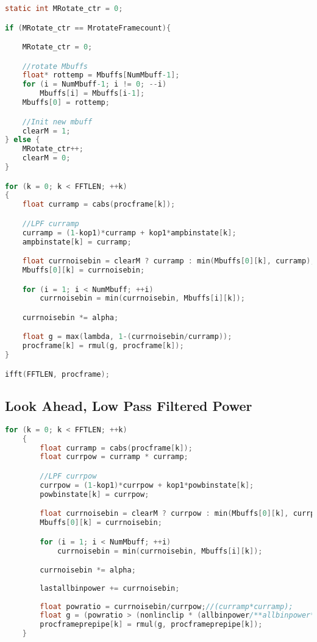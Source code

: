 \documentclass[11pt]{article} %
\begin{document}
{\begin{center}
\begin{lstlisting}[language = C]
static int MRotate_ctr = 0;

if (MRotate_ctr == MrotateFramecount){

	MRotate_ctr = 0;

	//rotate Mbuffs
	float* rottemp = Mbuffs[NumMbuff-1];
	for (i = NumMbuff-1; i != 0; --i)
		Mbuffs[i] = Mbuffs[i-1];
	Mbuffs[0] = rottemp;

	//Init new mbuff
	clearM = 1;
} else {
	MRotate_ctr++;
	clearM = 0;
}

for (k = 0; k < FFTLEN; ++k)
{
	float curramp = cabs(procframe[k]); 

	//LPF curramp
	curramp = (1-kop1)*curramp + kop1*ampbinstate[k];
	ampbinstate[k] = curramp;

	float currnoisebin = clearM ? curramp : min(Mbuffs[0][k], curramp);
	Mbuffs[0][k] = currnoisebin;

	for (i = 1; i < NumMbuff; ++i)
		currnoisebin = min(currnoisebin, Mbuffs[i][k]);

	currnoisebin *= alpha;

	float g = max(lambda, 1-(currnoisebin/curramp));
	procframe[k] = rmul(g, procframe[k]);
}

ifft(FFTLEN, procframe);
 	\end{lstlisting}
 \end{center}

\clearpage

  \subsection{Look Ahead, Low Pass Filtered Power} %
 \label{app:delayprepipe}
 \begin{center}
 	\begin{lstlisting}[language = C]
	for (k = 0; k < FFTLEN; ++k)
	{
		float curramp = cabs(procframe[k]);
		float currpow = curramp * curramp;

		//LPF currpow
		currpow = (1-kop1)*currpow + kop1*powbinstate[k];
		powbinstate[k] = currpow;

		float currnoisebin = clearM ? currpow : min(Mbuffs[0][k], currpow);
		Mbuffs[0][k] = currnoisebin;

		for (i = 1; i < NumMbuff; ++i)
			currnoisebin = min(currnoisebin, Mbuffs[i][k]);

		currnoisebin *= alpha;
		
		lastallbinpower += currnoisebin;
		
		float powratio = currnoisebin/currpow;//(curramp*curramp);
		float g = (powratio > (nonlinclip * (allbinpower/**allbinpower*/))) ? 0 : max(lambda, 1-sqrt(powratio));
		procframeprepipe[k] = rmul(g, procframeprepipe[k]);
	}


\end{lstlisting}
\end{center}}
\end{document}
